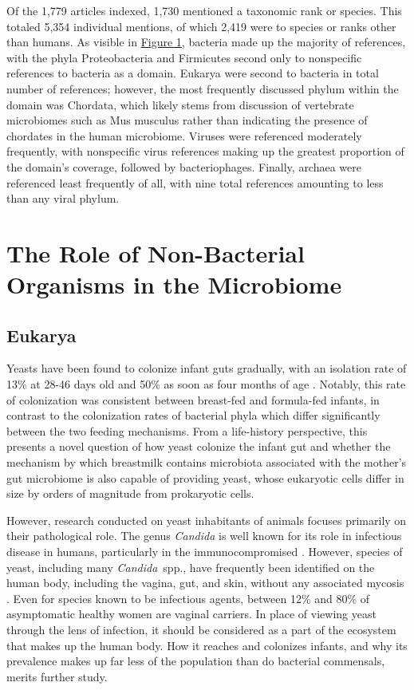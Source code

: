 \documentclass[american]{../../../coursework}
\begin{document}
Of the 1,779 articles indexed, 1,730 mentioned a taxonomic rank or species.
This totaled 5,354 individual mentions, of which 2,419 were to species or
ranks other than humans. As visible in \hyperref[fig:1]{Figure 1}, bacteria
made up the majority of references, with the phyla Proteobacteria and
Firmicutes second only to nonspecific references to bacteria as a domain.
Eukarya were second to bacteria in total number of references; however, the
most frequently discussed phylum within the domain was Chordata, which likely
stems from discussion of vertebrate microbiomes such as Mus musculus rather
than indicating the presence of chordates in the human microbiome. Viruses
were referenced moderately frequently, with nonspecific virus references
making up the greatest proportion of the domain's coverage, followed by
bacteriophages. Finally, archaea were referenced least frequently of all,
with nine total references amounting to less than any viral phylum.

\section{The Role of Non-Bacterial Organisms in the Microbiome}

\subsection{Eukarya}

Yeasts have been found to colonize infant guts gradually, with an isolation
rate of 13\% at 28-46 days old \parencite{Ben84} and 50\% as
soon as four months of age \parencite{Ell75}.
Notably, this rate of colonization was consistent between breast-fed and
formula-fed infants, in contrast to the colonization rates of bacterial phyla
which differ significantly between the two feeding mechanisms. From a
life-history perspective, this presents a novel question of how yeast
colonize the infant gut and whether the mechanism by which breastmilk
contains microbiota associated with the mother's gut microbiome
\parencite{Mar13} is also capable of providing yeast, whose eukaryotic cells
differ in size by orders of magnitude from prokaryotic cells.

However, research conducted on yeast inhabitants of animals focuses primarily
on their pathological role. The genus \textit{Candida} is well known for its
role in infectious disease in humans, particularly in the immunocompromised
\parencite{Kou11}. However, species of yeast, including many
\textit{Candida}~spp., have frequently been identified on the human body,
including the vagina, gut, and skin, without any associated mycosis
\parencite{Man10}. Even for species known to be infectious agents, between
12\% \parencite{Cho86} and 80\% \parencite{Soe07} of asymptomatic healthy
women are vaginal carriers. In place of viewing yeast through the lens of
infection, it should be considered as a part of the ecosystem that makes up
the human body. How it reaches and colonizes infants, and why its prevalence
makes up far less of the population than do bacterial commensals, merits
further study.
\end{document}

